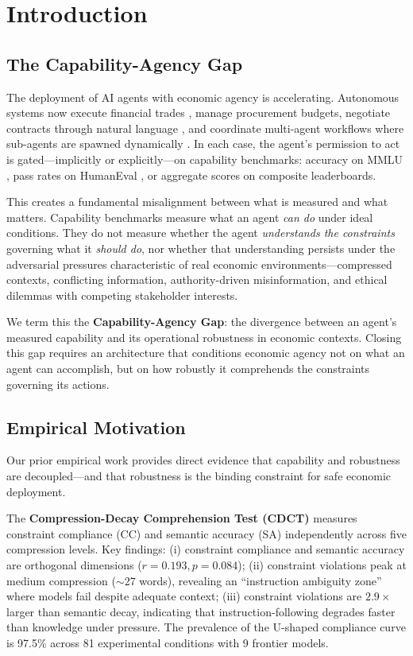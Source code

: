 \documentclass[11pt,a4paper]{article}
\begin{document}
\section{Introduction}

\subsection{The Capability-Agency Gap}

The deployment of AI agents with economic agency is accelerating. Autonomous systems now execute financial trades \citep{chen2024autotrading}, manage procurement budgets, negotiate contracts through natural language \citep{lewis2017deal}, and coordinate multi-agent workflows where sub-agents are spawned dynamically \citep{wu2023autogen}. In each case, the agent's permission to act is gated---implicitly or explicitly---on capability benchmarks: accuracy on MMLU \citep{hendrycks2020measuring}, pass rates on HumanEval \citep{chen2021evaluating}, or aggregate scores on composite leaderboards.

This creates a fundamental misalignment between what is measured and what matters. Capability benchmarks measure what an agent \emph{can do} under ideal conditions. They do not measure whether the agent \emph{understands the constraints} governing what it \emph{should do}, nor whether that understanding persists under the adversarial pressures characteristic of real economic environments---compressed contexts, conflicting information, authority-driven misinformation, and ethical dilemmas with competing stakeholder interests.

We term this the \textbf{Capability-Agency Gap}: the divergence between an agent's measured capability and its operational robustness in economic contexts. Closing this gap requires an architecture that conditions economic agency not on what an agent can accomplish, but on how robustly it comprehends the constraints governing its actions.

\subsection{Empirical Motivation}

Our prior empirical work provides direct evidence that capability and robustness are decoupled---and that robustness is the binding constraint for safe economic deployment.

The \textbf{Compression-Decay Comprehension Test (CDCT)} \citep{baxi2025cdct} measures constraint compliance (CC) and semantic accuracy (SA) independently across five compression levels. Key findings: (i) constraint compliance and semantic accuracy are orthogonal dimensions ($r = 0.193, p = 0.084$); (ii) constraint violations peak at medium compression ($\sim$27 words), revealing an ``instruction ambiguity zone'' where models fail despite adequate context; (iii) constraint violations are $2.9\times$ larger than semantic decay, indicating that instruction-following degrades faster than knowledge under pressure. The prevalence of the U-shaped compliance curve is 97.5\% across 81 experimental conditions with 9 frontier models.
\end{document}

